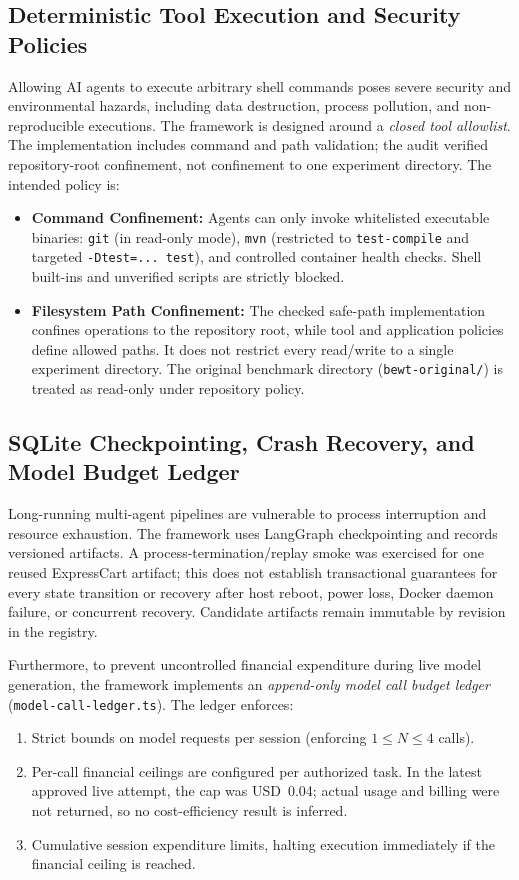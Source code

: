 \documentclass[pdflatex,sn-mathphys-num]{sn-jnl}
\begin{document}
\subsection{Deterministic Tool Execution and Security Policies}

Allowing AI agents to execute arbitrary shell commands poses severe security and environmental hazards, including data destruction, process pollution, and non-reproducible executions. The framework is designed around a \textit{closed tool allowlist}. The implementation includes command and path validation; the audit verified repository-root confinement, not confinement to one experiment directory. The intended policy is:
\begin{itemize}
    \item \textbf{Command Confinement:} Agents can only invoke whitelisted executable binaries: \texttt{git} (in read-only mode), \texttt{mvn} (restricted to \texttt{test-compile} and targeted \texttt{-Dtest=... test}), and controlled container health checks. Shell built-ins and unverified scripts are strictly blocked.
    \item \textbf{Filesystem Path Confinement:} The checked safe-path implementation confines operations to the repository root, while tool and application policies define allowed paths. It does not restrict every read/write to a single experiment directory. The original benchmark directory (\texttt{bewt-original/}) is treated as read-only under repository policy.
\end{itemize}

\subsection{SQLite Checkpointing, Crash Recovery, and Model Budget Ledger}

Long-running multi-agent pipelines are vulnerable to process interruption and resource exhaustion. The framework uses LangGraph checkpointing and records versioned artifacts. A process-termination/replay smoke was exercised for one reused ExpressCart artifact; this does not establish transactional guarantees for every state transition or recovery after host reboot, power loss, Docker daemon failure, or concurrent recovery. Candidate artifacts remain immutable by revision in the registry.

Furthermore, to prevent uncontrolled financial expenditure during live model generation, the framework implements an \textit{append-only model call budget ledger} (\texttt{model-call-ledger.ts}). The ledger enforces:
\begin{enumerate}
    \item Strict bounds on model requests per session (enforcing $1 \le N \le 4$ calls).
    \item Per-call financial ceilings are configured per authorized task. In the latest approved live attempt, the cap was USD~0.04; actual usage and billing were not returned, so no cost-efficiency result is inferred.
    \item Cumulative session expenditure limits, halting execution immediately if the financial ceiling is reached.
\end{enumerate}
\end{document}
